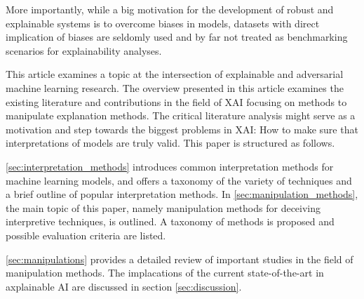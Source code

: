 More importantly, while a big motivation for the development of robust and explainable systems is to overcome biases in models, datasets with direct implication of biases are seldomly used and by far not treated as benchmarking scenarios for explainability analyses.  





This article examines a topic at the intersection of explainable and adversarial machine learning research. 
The overview presented in this article examines the existing literature and contributions in the field of XAI focusing on methods to manipulate explanation methods.  
The critical literature analysis might serve as a motivation and step towards the biggest problems in XAI: How to make sure that interpretations of models are truly valid. 
This paper is structured as follows.

\autoref{sec:interpretation_methods} introduces common interpretation methods for machine learning models, and offers a taxonomy of the variety of techniques and a brief outline of popular interpretation methods.
In \autoref{sec:manipulation_methods}, the main topic of this paper, namely manipulation methods for deceiving interpretive techniques, is outlined. A taxonomy of methods is proposed and possible evaluation criteria are listed.

\autoref{sec:manipulations} provides a detailed review of important studies in the field of manipulation methods. The implacations of the current state-of-the-art in axplainable AI are discussed in section \autoref{sec:discussion}.